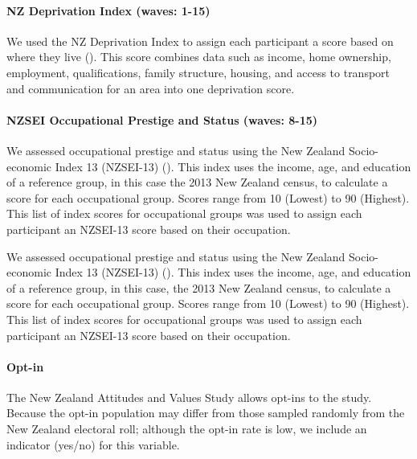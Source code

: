 \documentclass[
  single column]{article}
\let\oldparagraph\paragraph
\renewcommand{\paragraph}[1]{\oldparagraph{#1}\mbox{}}
\begin{document}
\paragraph{NZ Deprivation Index (waves:
1-15)}\label{nz-deprivation-index-waves-1-15}

We used the NZ Deprivation Index to assign each participant a score
based on where they live (). This score combines data such as income, home
ownership, employment, qualifications, family structure, housing, and
access to transport and communication for an area into one deprivation
score.

\paragraph{NZSEI Occupational Prestige and Status (waves:
8-15)}\label{nzsei-occupational-prestige-and-status-waves-8-15}

We assessed occupational prestige and status using the New Zealand
Socio-economic Index 13 (NZSEI-13) (). This index uses the income, age, and education of a
reference group, in this case the 2013 New Zealand census, to calculate
a score for each occupational group. Scores range from 10 (Lowest) to 90
(Highest). This list of index scores for occupational groups was used to
assign each participant an NZSEI-13 score based on their occupation.

We assessed occupational prestige and status using the New Zealand
Socio-economic Index 13 (NZSEI-13) (). This index uses the income, age, and education of a
reference group, in this case, the 2013 New Zealand census, to calculate
a score for each occupational group. Scores range from 10 (Lowest) to 90
(Highest). This list of index scores for occupational groups was used to
assign each participant an NZSEI-13 score based on their occupation.

\paragraph{Opt-in}\label{opt-in}

The New Zealand Attitudes and Values Study allows opt-ins to the study.
Because the opt-in population may differ from those sampled randomly
from the New Zealand electoral roll; although the opt-in rate is low, we
include an indicator (yes/no) for this variable.
\end{document}
